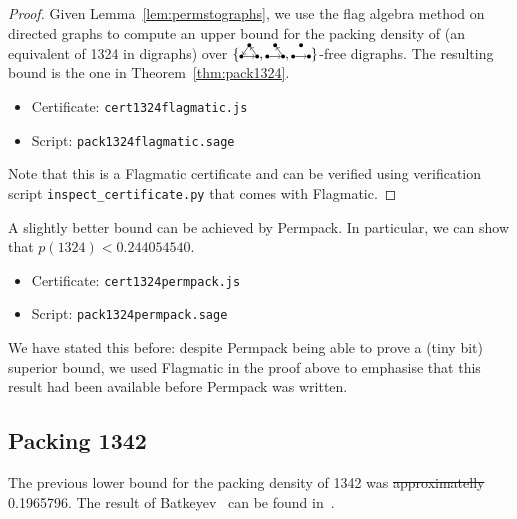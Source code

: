 \documentclass[12pt, a4paper, twoside]{report}
\providecommand{\DIFaddtex}[1]{{\protect\color{blue}\uwave{#1}}} %
\providecommand{\DIFdeltex}[1]{{\protect\color{red}\sout{#1}}}                      %
\providecommand{\DIFaddbegin}{} %
\providecommand{\DIFaddend}{} %
\providecommand{\DIFdelbegin}{} %
\providecommand{\DIFdelend}{} %
\providecommand{\DIFadd}[1]{\texorpdfstring{\DIFaddtex{#1}}{#1}} %
\providecommand{\DIFdel}[1]{\texorpdfstring{\DIFdeltex{#1}}{}} %
\begin{document}
\begin{proof}
Given Lemma~\ref{lem:permstographs}, we use the flag algebra method on directed graphs to compute an upper bound for the packing density of \digraphacbd (an equivalent of 1324 in digraphs) over $\{\dicycle, \twochain, \orcocherry\}$-free digraphs. The resulting bound is the one in Theorem~\ref{thm:pack1324}.
\begin{itemize}
\item Certificate: \texttt{cert1324flagmatic.js}
\item Script: \texttt{pack1324flagmatic.sage}
\end{itemize}
Note that this is a Flagmatic certificate and can be verified using verification script \texttt{inspect\_certificate.py} that comes with Flagmatic.


\end{proof}

A slightly better bound can be achieved by Permpack. In particular, we can show that $p(1324)< 0.244054540$.
\begin{itemize}
\item Certificate: \texttt{cert1324permpack.js}
\item Script: \texttt{pack1324permpack.sage}
\end{itemize}
We have stated this before: despite Permpack being able to prove a (tiny bit) superior bound, we used Flagmatic in the proof above to emphasise that this result had been available before Permpack was written. 


\subsection{Packing 1342}
\label{sec:pack1342}

The previous lower bound for the packing density of 1342 was \DIFdelbegin \DIFdel{approximatelly }\DIFdelend \DIFaddbegin \DIFadd{approximately }\DIFaddend 0.1965796. The result of Batkeyev~\cite{batkeyev} can be found in~\cite{albert2002packing}.
\end{document}
